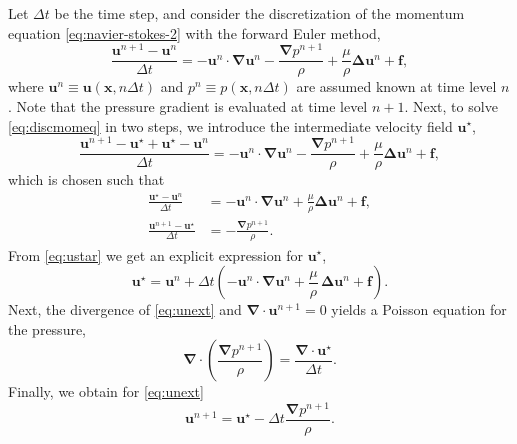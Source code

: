 \documentclass[11pt,b5paper,DIV=calc,BCOR1.3cm,headings=small,%
               footinclude=false,headsepline]{scrbook}
\newcommand*{\vct}[1]{\ensuremath{\boldsymbol{#1}}}
\newcommand*{\del}{\boldsymbol\nabla}
\renewcommand*{\div}{\del\cdot}
\newcommand*{\grad}{\del}
\newcommand*{\lapl}{\boldsymbol\Delta}
\begin{document}
Let $\Delta t$ be the time step, and consider the discretization of the
momentum equation \eqref{eq:navier-stokes-2} with the forward Euler method,
\begin{equation}
  \frac{\vct u^{n+1} - \vct u^n}{\Delta t}
  = -\vct u^n\cdot\grad\vct u^n
    - \frac{\grad p^{n+1}}{\rho} + \frac\mu\rho\lapl\vct u^n + \vct f,
  \label{eq:discmomeq}
\end{equation}
where $\vct u^n\equiv\vct u(\vct x,n\Delta t)$ and $p^n\equiv p(\vct x,n\Delta
t)$ are assumed known at time level $n$.  Note that the pressure gradient is
evaluated at time level $n+1$.  Next, to solve \eqref{eq:discmomeq} in two
steps, we introduce the intermediate velocity field $\vct u^\star$,
\begin{equation}
  \frac{\vct u^{n+1} - \vct u^\star + \vct u^\star - \vct u^n}{\Delta t}
  = -\vct u^n\cdot\grad\vct u^n
    - \frac{\grad p^{n+1}}{\rho} + \frac\mu\rho\lapl\vct u^n + \vct f,
\end{equation}
which is chosen such that
\begin{align}
  \label{eq:ustar}
  \frac{\vct u^\star - \vct u^n}{\Delta t}
    &= -\vct u^n\cdot\grad\vct u^n + \frac\mu\rho\lapl\vct u^n + \vct f, \\
  \label{eq:unext}
  \frac{\vct u^{n+1} - \vct u^\star}{\Delta t} &= - \frac{\grad p^{n+1}}{\rho}.
\end{align}
From \eqref{eq:ustar} we get an explicit expression for $\vct u^\star$,
\begin{equation}
  \vct u^{\star} = \vct u^n
    + \Delta t\left(-\vct u^n\cdot\grad\vct u^n
        + \frac\mu\rho\,\lapl\vct u^n + \vct f\right).
\end{equation}
Next, the divergence of \eqref{eq:unext} and $\div\vct u^{n+1} = 0$ yields
a Poisson equation for the pressure,
\begin{equation}
  \div\left(\frac{\grad p^{n+1}}{\rho}\right)
    = \frac{\div\vct u^\star}{\Delta t}.
  \label{eq:PoissonChorin}
\end{equation}
Finally, we obtain for \eqref{eq:unext}
\begin{equation}
  \vct u^{n+1} = \vct u^\star - \Delta t\frac{\grad p^{n+1}}{\rho}.
  \label{eq:velcorrection}
\end{equation}
\end{document}
